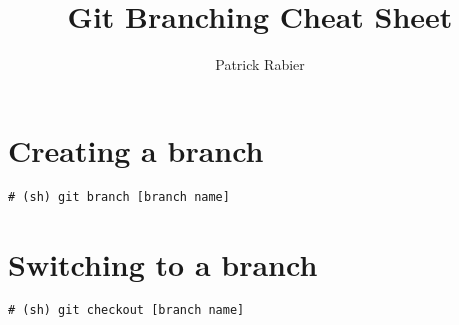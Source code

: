 \documentclass{article}
\title{Git Branching Cheat Sheet}
\author{Patrick Rabier}
\begin{document}
\maketitle

\section{Creating a branch}
\begin{lstlisting}[style=BashInputStyle]
    # (sh) git branch [branch name]
\end{lstlisting}

\section{Switching to a branch}
\begin{lstlisting}[style=BashInputStyle]
    # (sh) git checkout [branch name]
\end{lstlisting}
\end{document}
